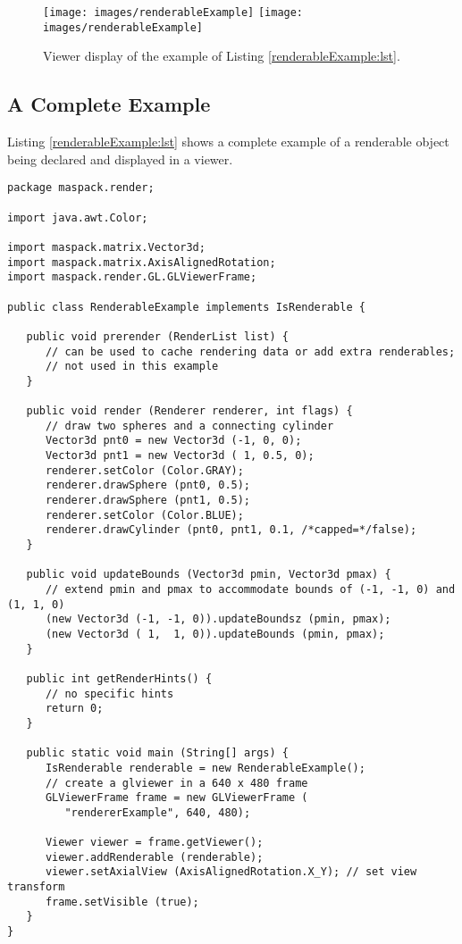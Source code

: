 %
\begin{figure}[t]
\begin{center}
\iflatexml
 \texttt{[image: images/renderableExample]}
\else
 \texttt{[image: images/renderableExample]}
\fi
\end{center}
\caption{Viewer display of the example of Listing \ref{renderableExample:lst}.}
\label{renderableExample:fig}
\end{figure}
%

\subsection{A Complete Example}

Listing \ref{renderableExample:lst} shows a complete example
of a renderable object being declared and displayed in a viewer.
%
\begin{lstlisting}[caption={Declaration and display of a renderable
object.},
label=renderableExample:lst]
package maspack.render;

import java.awt.Color;

import maspack.matrix.Vector3d;
import maspack.matrix.AxisAlignedRotation;
import maspack.render.GL.GLViewerFrame;

public class RenderableExample implements IsRenderable {

   public void prerender (RenderList list) {
      // can be used to cache rendering data or add extra renderables;
      // not used in this example
   }

   public void render (Renderer renderer, int flags) {
      // draw two spheres and a connecting cylinder
      Vector3d pnt0 = new Vector3d (-1, 0, 0);
      Vector3d pnt1 = new Vector3d ( 1, 0.5, 0);
      renderer.setColor (Color.GRAY);
      renderer.drawSphere (pnt0, 0.5);
      renderer.drawSphere (pnt1, 0.5);
      renderer.setColor (Color.BLUE);
      renderer.drawCylinder (pnt0, pnt1, 0.1, /*capped=*/false);
   }

   public void updateBounds (Vector3d pmin, Vector3d pmax) {
      // extend pmin and pmax to accommodate bounds of (-1, -1, 0) and (1, 1, 0)
      (new Vector3d (-1, -1, 0)).updateBoundsz (pmin, pmax);
      (new Vector3d ( 1,  1, 0)).updateBounds (pmin, pmax);
   }

   public int getRenderHints() {
      // no specific hints
      return 0; 
   }

   public static void main (String[] args) {
      IsRenderable renderable = new RenderableExample();
      // create a glviewer in a 640 x 480 frame      
      GLViewerFrame frame = new GLViewerFrame (
         "rendererExample", 640, 480);

      Viewer viewer = frame.getViewer();
      viewer.addRenderable (renderable);
      viewer.setAxialView (AxisAlignedRotation.X_Y); // set view transform
      frame.setVisible (true);
   }
}
\end{lstlisting}
